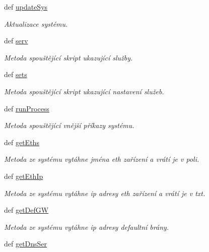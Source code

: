 \begin{DoxyCompactItemize}
def \hyperlink{classConsSys_1_1ConsSys_adebc704ed551e5de7db2a5fbdae6af62}{update\-Sys}
\begin{DoxyCompactList}\small\item\em Aktualizace systému. \end{DoxyCompactList}\item 
def \hyperlink{classConsSys_1_1ConsSys_aeb3c2474c312e9c4aa5b10fd26c39474}{serv}
\begin{DoxyCompactList}\small\item\em Metoda spouštějící skript ukazující služby. \end{DoxyCompactList}\item 
def \hyperlink{classConsSys_1_1ConsSys_a5ede7c786f39d534aacace0fe599ffcb}{sets}
\begin{DoxyCompactList}\small\item\em Metoda spouštějící skript ukazující nastavení služeb. \end{DoxyCompactList}\item 
def \hyperlink{classConsSys_1_1ConsSys_ab74dd7930d406b91de35d324651bd92e}{run\-Process}
\begin{DoxyCompactList}\small\item\em Metoda spouštějící vnější příkazy systému. \end{DoxyCompactList}\item 
def \hyperlink{classConsSys_1_1ConsSys_a5bd98412b24730939bdfc10033ae0b51}{get\-Eths}
\begin{DoxyCompactList}\small\item\em Metoda ze systému vytáhne jména eth zařízení a vrátí je v poli. \end{DoxyCompactList}\item 
def \hyperlink{classConsSys_1_1ConsSys_a9d9dce75471df6c59b12c8e440e849d5}{get\-Eth\-Ip}
\begin{DoxyCompactList}\small\item\em Metoda ze systému vytáhne ip adresy eth zařízení a vrátí je v txt. \end{DoxyCompactList}\item 
def \hyperlink{classConsSys_1_1ConsSys_ab56242cf1d07da89a1bbdad369926f77}{get\-Def\-G\-W}
\begin{DoxyCompactList}\small\item\em Metoda ze systému vytáhne ip adresy defaultní brány. \end{DoxyCompactList}\item 
def \hyperlink{classConsSys_1_1ConsSys_aa4f9f92600aab89b6a70e72dbef258ee}{get\-Dns\-Ser}

\end{DoxyCompactItemize}
